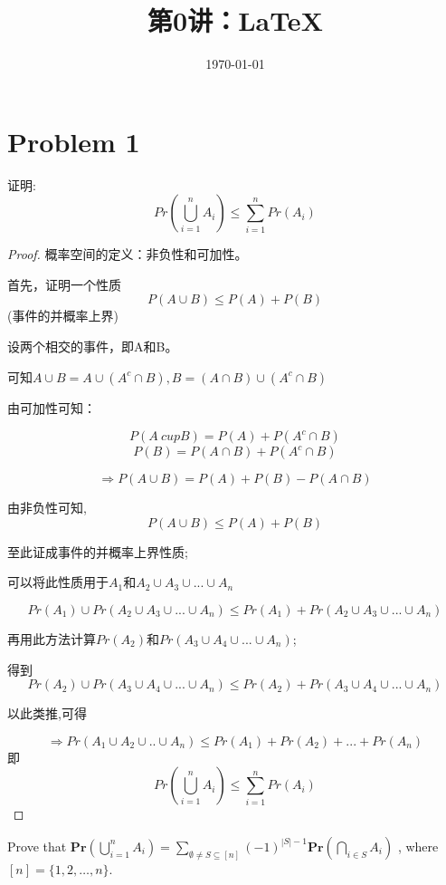 \documentclass[12pt, a4paper, oneside]{ctexart}
\title{\vspace{-2em}\textbf{第0讲：\LaTeX}}
\date{\today}
\begin{document}
\maketitle
\section*{Problem 1}
\begin{problem}
证明:
$$
  Pr(\bigcup_{i=1}^n A_i) \leq \sum_{i=1}^n Pr(A_i)
$$
\end{problem}

\begin{proof}
  概率空间的定义：非负性和可加性。

  首先，证明一个性质$$P(A\cup B) \leq P(A) + P(B)$$(事件的并概率上界)

  设两个相交的事件，即A和B。

  可知$A \cup B = A\cup (A^c \cap B), B=(A\cap B)\cup (A^c \cap B)$

  由可加性可知：

  $$P(A\ cup B) = P(A)+P(A^c \cap B)$$
  $$P(B) = P(A\cap B) + P(A^c\cap B)$$

  $$\Rightarrow P(A \cup B) = P(A)+P(B) - P(A \cap B)$$

  由非负性可知, $$P(A \cup B) \leq P(A)+P(B)$$

  至此证成事件的并概率上界性质;

  可以将此性质用于$A_1$和$A_2\cup A_3 \cup ... \cup A_n$

  $$Pr(A_1) \cup Pr(A_2\cup A_3 \cup ... \cup A_n) \leq Pr(A_1) + Pr(A_2\cup A_3 \cup ... \cup A_n)$$

  再用此方法计算$Pr(A_2)$和$Pr(A_3\cup A_4 \cup ... \cup A_n)$;

  得到$$Pr(A_2) \cup Pr(A_3\cup A_4 \cup ... \cup A_n) \leq Pr(A_2) + Pr(A_3\cup A_4 \cup ... \cup A_n)$$

  以此类推,可得

  $$\Rightarrow Pr(A_1 \cup A_2 \cup .. \cup A_n) \leq Pr(A_1) + Pr(A_2) + ... + Pr(A_n)$$
  即
  $$Pr(\bigcup_{i=1}^n A_i) \leq \sum_{i=1}^n Pr(A_i)
  $$
\end{proof}


\begin{problem}
 Prove that
$\mathbf{Pr}\left( \bigcup_{i=1}^n A_i\right) = \sum_{\emptyset \neq S \subseteq [n]} (-1)^{|S|-1} \mathbf{Pr}\left( \bigcap_{i \in S} A_i \right) $
, where$ [n]=\{1,2,\ldots,n\} $.
\end{problem}
\end{document}

